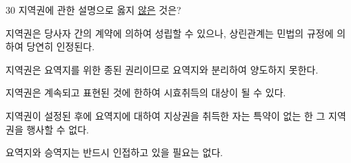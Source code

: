 \begin{question}{30}
지역권에 관한 설명으로 옳지 \uline{않은} 것은?
\begin{choices}
  \item 지역권은 당사자 간의 계약에 의하여 성립할 수 있으나, 상린관계는 민법의 규정에 의하여 당연히 인정된다.
  \item 지역권은 요역지를 위한 종된 권리이므로 요역지와 분리하여 양도하지 못한다.
  \item 지역권은 계속되고 표현된 것에 한하여 시효취득의 대상이 될 수 있다.
  \item 지역권이 설정된 후에 요역지에 대하여 지상권을 취득한 자는 특약이 없는 한 그 지역권을 행사할 수 없다.
  \item 요역지와 승역지는 반드시 인접하고 있을 필요는 없다.
\end{choices}
\end{question}
